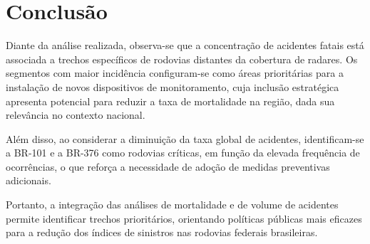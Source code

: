 \documentclass[12pt]{article}
\begin{document}
\FloatBarrier
\section{Conclusão}

Diante da análise realizada, observa-se que a concentração de acidentes fatais está associada a trechos específicos de rodovias distantes da cobertura de radares. Os segmentos com maior incidência configuram-se como áreas prioritárias para a instalação de novos dispositivos de monitoramento, cuja inclusão estratégica apresenta potencial para reduzir a taxa de mortalidade na região, dada sua relevância no contexto nacional.

Além disso, ao considerar a diminuição da taxa global de acidentes, identificam-se a BR-101 e a BR-376 como rodovias críticas, em função da elevada frequência de ocorrências, o que reforça a necessidade de adoção de medidas preventivas adicionais.

Portanto, a integração das análises de mortalidade e de volume de acidentes permite identificar trechos prioritários, orientando políticas públicas mais eficazes para a redução dos índices de sinistros nas rodovias federais brasileiras.




\end{document}

